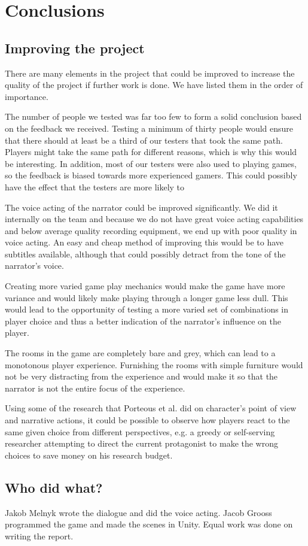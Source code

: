 \section{Conclusions}

\subsection{Improving the project}
There are many elements in the project that could be improved to increase the quality of the project if further work is done. We have listed them in the order of importance.

The number of people we tested was far too few to form a solid conclusion based on the feedback we received. Testing a minimum of thirty people would ensure that there should at least be a third of our testers that took the same path. Players might take the same path for different reasons, which is why this would be interesting. In addition, most of our testers were also used to playing games, so the feedback is biased towards more experienced gamers. This could possibly have the effect that the testers are more likely to  

The voice acting of the narrator could be improved significantly. We did it internally on the team and because we do not have great voice acting capabilities and below average quality recording equipment, we end up with poor quality in voice acting. An easy and cheap method of improving this would be to have subtitles available, although that could possibly detract from the tone of the narrator's voice.

Creating more varied game play mechanics would make the game have more variance and would likely make playing through a longer game less dull. This would lead to the opportunity of testing a more varied set of combinations in player choice and thus a better indication of the narrator's influence on the player.

The rooms in the game are completely bare and grey, which can lead to a monotonous player experience. Furnishing the rooms with simple furniture would not be very distracting from the experience and would make it so that the narrator is not the entire focus of the experience.

Using some of the research that Porteous et al. \cite{Por} did on character's point of view and narrative actions, it could be possible to observe how players react to the same given choice from different perspectives, e.g. a greedy or self-serving researcher attempting to direct the current protagonist to make the wrong choices to save money on his research budget.

\subsection{Who did what?}
Jakob Melnyk wrote the dialogue and did the voice acting. Jacob Grooss programmed the game and made the scenes in Unity. Equal work was done on writing the report.